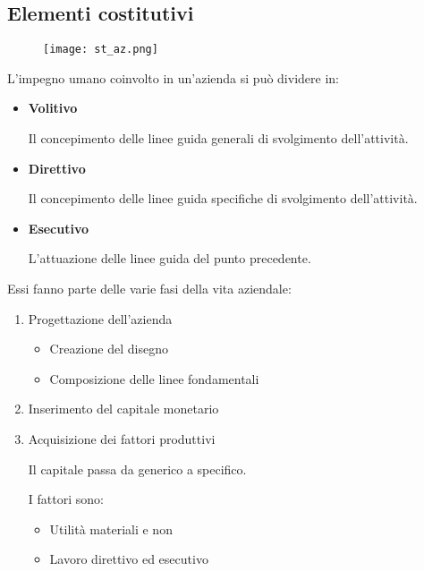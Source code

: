 \documentclass{article}
\begin{document}
\subsection{Elementi costitutivi}

\begin{figure}[ht]
    \centering
    \texttt{[image: st\_az.png]}
\end{figure}

\noindent L'impegno umano coinvolto in un'azienda si può dividere in:
\begin{itemize}
    \item \textbf{Volitivo}

        Il concepimento delle linee guida generali di svolgimento dell’attività.

    \item \textbf{Direttivo}

        Il concepimento delle linee guida specifiche di svolgimento dell'attività.
    
    \item \textbf{Esecutivo}

        L'attuazione delle linee guida del punto precedente.\newline
    
\end{itemize}

\noindent Essi fanno parte delle varie fasi della vita aziendale:
\begin{enumerate}
    \item Progettazione dell'azienda
        \begin{itemize}
            \item Creazione del disegno
            \item Composizione delle linee fondamentali
        \end{itemize}
    \item Inserimento del capitale monetario
    \item Acquisizione dei fattori produttivi

        \vspace{5pt}

        Il capitale passa da generico a specifico.\newline

        I fattori sono:
        \begin{itemize}
            \item Utilità materiali e non
            \item Lavoro direttivo ed esecutivo\newline
        \end{itemize}
\end{enumerate}
\end{document}
